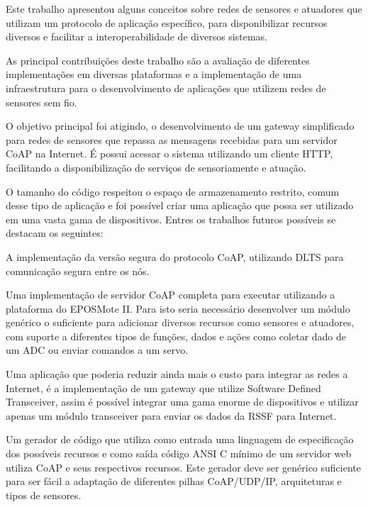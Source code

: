 Este trabalho apresentou alguns conceitos sobre redes de sensores e atuadores que utilizam um protocolo de aplica\c{c}\~ao espec\'ifico, para disponibilizar recursos diversos e facilitar a interoperabilidade de diversos sistemas.

As principal contribui\c{c}\~oes deste trabalho s\~ao a avalia\c{c}\~ao de diferentes implementa\c{c}\~oes em diversas plataformas e a implementa\c{c}\~ao de uma infraestrutura para o desenvolvimento de aplica\c{c}\~oes que utilizem redes de sensores sem fio.

O objetivo principal foi atigindo, o desenvolvimento de um gateway simplificado para redes de sensores que repassa as mensagens recebidas para um servidor CoAP na Internet. \'E possui acessar o sistema utilizando um cliente HTTP, facilitando a disponibiliza\c{c}\~ao de servi\c{c}os de sensoriamente e atua\c{c}\~ao.

O tamanho do c\'odigo respeitou o espa\c{c}o de armazenamento restrito, comum desse tipo de aplica\c{c}\~ao e foi poss\'ivel criar uma aplica\c{c}\~ao que possa ser utilizado em uma vasta gama de dispositivos. Entres os trabalhos futuros poss\'iveis se destacam os seguintes:

A implementa\c{c}\~ao da vers\~ao segura do protocolo CoAP, utilizando DLTS para comunica\c{c}\~ao segura entre os n\'os.

Uma implementa\c{c}\~ao de servidor CoAP completa para executar utilizando a plataforma do EPOSMote II. Para isto seria necess\'ario desenvolver um m\'odulo gen\'erico o suficiente para adicionar diversos recursos como sensores e atuadores, com suporte a diferentes tipos de fun\c{c}\~oes, dados e a\c{c}\~oes como coletar dado de um ADC ou enviar comandos a um servo.

Uma aplica\c{c}\~ao que poderia reduzir ainda mais o custo para integrar as redes a Internet, \'e a implementa\c{c}\~ao de um gateway que utilize Software Defined Transceiver, assim \'e poss\'ivel integrar uma gama enorme de dispositivos e utilizar apenas um m\'odulo transceiver para enviar os dados da RSSF para Internet.

Um gerador de c\'odigo que utiliza como entrada uma linguagem de especifica\c{c}\~ao dos poss\'iveis recursos e como sa\'ida c\'odigo ANSI C m\'inimo de um servidor web utiliza CoAP e seus respectivos recursos. Este gerador deve ser gen\'erico suficiente para ser f\'acil a adapta\c{c}\~ao de diferentes pilhas CoAP/UDP/IP, arquiteturas e tipos de sensores.
